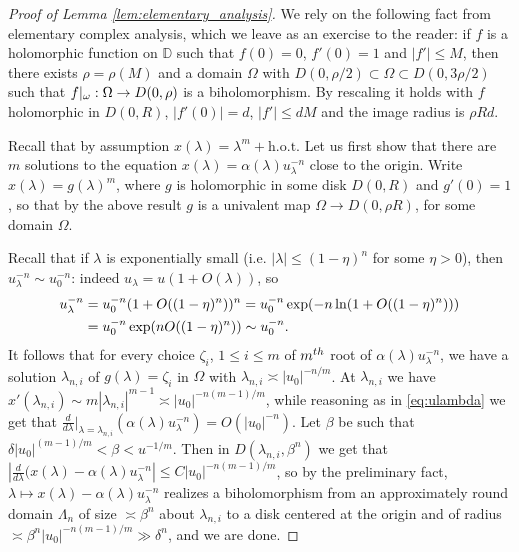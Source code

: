 \documentclass[10pt,a4paper]{amsart}
\newcommand{\D}{\mathbb{D}}
\newcommand{\abs}[1]{\left\vert#1\right\vert}
\newcommand{\hot}{{\mathrm{h.o.t.}}}
\newcommand{\rest}[1]{ \arrowvert_{#1}}
\begin{document}
\begin{proof}[Proof of Lemma \ref{lem:elementary_analysis}] We  rely on the following   fact 
 from elementary  complex analysis, which we leave as an exercise to the reader: if $f$ is a holomorphic function on $\D$ such that $f(0)  = 0$, $f'(0) = 1$ and $\abs{f'}\leq M$, then there exists $\rho= \rho(M)$ 
and a domain $\Omega$ with $D(0, \rho/2)\subset \Omega\subset D(0, 3\rho/2)$ such that $f\rest{\omega}:\Omega\to D(0, \rho)$ is a biholomorphism. By rescaling it holds with $f$ holomorphic in $D(0, R)$, 
$\abs{f'(0)} = d$, $\abs{f'}\leq dM$ and the image radius is $\rho Rd$. 


Recall that by assumption $x(\lambda) = \lambda^m+\hot$
 Let us first show that there are $m$ solutions to the equation $x(\lambda)   = \alpha(\lambda) u_\lambda^{-n}$ close to the origin.
 Write  $x(\lambda) = g(\lambda)^m$, where $g$ is holomorphic in some disk 
$D(0, R)$ and $g'(0) = 1$, so that  by the above result 
$g$ is a univalent  map  $\Omega \to D(0,  \rho R)$, for some domain $\Omega$.

Recall that if 
 $\lambda$ is exponentially small (i.e. $\abs{\lambda}\leq (1-\eta)^n$ for some $\eta>0$), then
$u_\lambda^{-n}\sim  u_0^{-n}$: indeed $u_\lambda = u(1+O(\lambda))$, so 
\begin{align}\label{eq:ulambda}
u_\lambda^{-n} &= u_0^{-n}(1+ O((1-\eta)^n))^n = u_0^{-n} \exp(-n\ln(1+O((1-\eta)^n) ))   \\ & \notag
= u_0^{-n} \exp(n O((1-\eta)^n) )  
  \sim u_0^{-n}. 
\end{align}
 It follows that for every choice $\zeta_i$, $1\leq i \leq m$ 
  of  $m^{\rm th}$ root of $\alpha(\lambda) u_\lambda^{-n}$, we have a solution $\lambda_{n,i}$ 
of $g(\lambda)   = \zeta_i$ in $\Omega$ with $\lambda_{n,i}\asymp \abs{u_0}^{-n/m}$. 
At $\lambda_{n,i}$ we have $x'(\lambda_{n,i}) 
\sim m \abs{\lambda_{n,i}}^{m-1} \asymp
\abs{u_0}^{-n({m-1})/{m}}$, while reasoning as in \eqref{eq:ulambda} we get that 
$\frac{d}{d\lambda}\big\vert_{\lambda = \lambda_{n, i}}( \alpha(\lambda) u_\lambda^{-n}) 
= O(\abs{u_0}^{-n})$. Let $\beta$ be such that 
$ \delta\abs{u_0}^{(m-1)/m}< \beta < u^{-1/m}$. Then in $D(\lambda_{n,i}, \beta^n)$ we get that 
$\abs{\frac{d}{d\lambda}(x(\lambda) - \alpha(\lambda) u_\lambda^{-n}} \leq C \abs{u_0}^{-n({m-1})/{m}}$, 
so by the preliminary fact, 
$\lambda\mapsto x(\lambda) - \alpha(\lambda) u_\lambda^{-n}$ realizes  a biholomorphism 
 from an approximately round domain $\Lambda_n$
 of size $\asymp \beta^n$  about $\lambda_{n,i}$
 to a disk centered at the origin and 
 of radius $\asymp  \beta^n\abs{u_0}^{- n(m-1)/m}\gg \delta^n$, and we are done. 
\end{proof}
\end{document}
